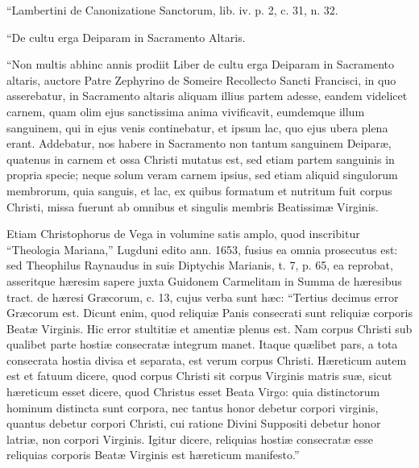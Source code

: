 ``Lambertini de Canonizatione Sanctorum, lib. iv. p. 2, c. 31, n.
32.


``De cultu erga Deiparam in Sacramento Altaris.


``Non multis abhinc annis prodiit Liber de cultu erga Deiparam in
Sacramento altaris, auctore Patre Zephyrino de Someire Recollecto Sancti
Francisci, in quo asserebatur, in Sacramento altaris aliquam illius
partem adesse, eandem videlicet carnem, quam olim ejus sanctissima anima
vivificavit, eumdemque illum sanguinem, qui in ejus venis
continebatur, et ipsum lac, quo ejus ubera plena erant. Addebatur, nos
habere in Sacramento non tantum sanguinem Deiparæ, quatenus in carnem
et ossa Christi mutatus est, sed etiam partem sanguinis in propria
specie; neque solum veram carnem ipsius, sed etiam aliquid singulorum
membrorum, quia sanguis, et lac, ex quibus formatum et nutritum fuit
corpus Christi, missa fuerunt ab omnibus et singulis membris Beatissimæ
Virginis.


Etiam Christophorus de Vega in volumine satis amplo, quod inscribitur
``Theologia Mariana,'' Lugduni edito ann. 1653, fusius ea omnia
prosecutus est: sed Theophilus Raynaudus in suis Diptychis Marianis, t.
7, p. 65, ea reprobat, asseritque hæresim sapere juxta Guidonem
Carmelitam in Summa de hæresibus tract. de hæresi Græcorum, c. 13,
cujus verba sunt hæc: ``Tertius decimus error Græcorum est. Dicunt
enim, quod reliquiæ Panis consecrati sunt reliquiæ corporis Beatæ
Virginis. Hic error stultitiæ et amentiæ plenus est. Nam corpus
Christi sub qualibet parte hostiæ consecratæ integrum manet. Itaque
quælibet pars, a tota consecrata hostia divisa et separata, est verum
corpus Christi. Hæreticum autem est et fatuum dicere, quod corpus
Christi sit corpus Virginis matris suæ, sicut hæreticum esset dicere,
quod Christus esset Beata Virgo: quia distinctorum hominum distincta
sunt corpora, nec tantus honor debetur corpori virginis, quantus debetur
corpori Christi, cui ratione Divini Suppositi debetur honor latriæ, non
corpori Virginis. Igitur dicere, reliquias hostiæ consecratæ esse
reliquias corporis Beatæ Virginis est hæreticum manifesto.''

